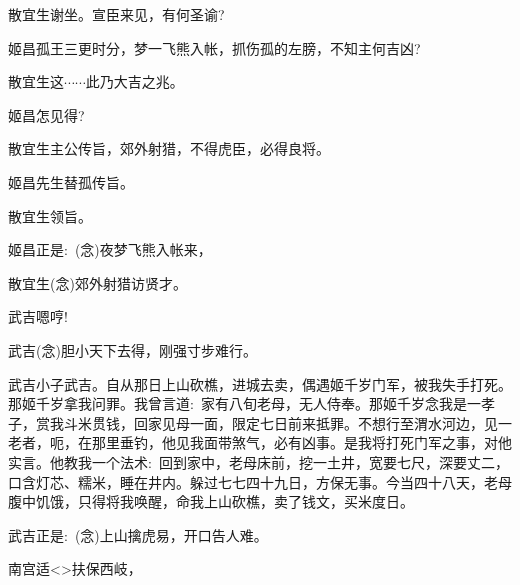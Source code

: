 {散宜生\hspace{20pt}谢坐。宣臣来见，有何圣谕?

姬昌\hspace{30pt}孤王三更时分，梦一飞熊入帐，抓伤孤的左膀，不知主何吉凶?

散宜生\hspace{20pt}这$\cdots{}\cdots{}$此乃大吉之兆。

姬昌\hspace{30pt}怎见得?

散宜生\hspace{20pt}主公传旨，郊外射猎，不得虎臣，必得良将。

姬昌\hspace{30pt}先生替孤传旨。

散宜生\hspace{20pt}领旨。

姬昌\hspace{30pt}正是:~({\akai 念})夜梦飞熊入帐来，

	散宜生\hspace{20pt}({\akai 念})郊外射猎访贤才。

\vspace{5pt}

武吉\hspace{30pt}嗯哼!

武吉\hspace{30pt}({\akai 念})胆小天下去得，刚强寸步难行。

\setlength{\hangindent}{52pt}   %
{武吉\hspace{30pt}小子武吉。自从那日上山砍樵，进城去卖，偶遇姬千岁门军，被我失手打死。那姬千岁拿我问罪。我曾言道:~家有八旬老母，无人侍奉。那姬千岁念我是一孝子，赏我斗米贯钱，回家见母一面，限定七日前来抵罪。不想行至渭水河边，见一老者，呃，在那里垂钓，他见我面带煞气，必有凶事。是我将打死门军之事，对他实言。他教我一个法术:~回到家中，老母床前，挖一土井，宽要七尺，深要丈二，口含灯芯、糯米，睡在井内。躲过七七四十九日，方保无事。今当四十八天，老母腹中饥饿，只得将我唤醒，命我上山砍樵，卖了钱文，买米度日。}

武吉\hspace{30pt}正是:~({\akai 念})上山擒虎易，开口告人难。

\vspace{5pt}

	南宫适\hspace{20pt}\textless{}\!\textgreater{}扶保西岐，

}
